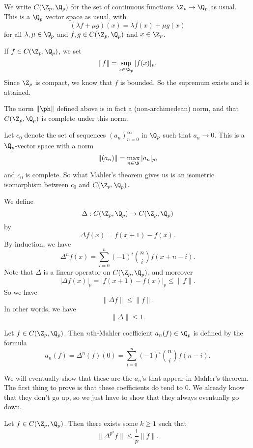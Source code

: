 \documentclass[a4paper]{article}
\begin{document}
We write $C(\Z_p, \Q_p)$ for the set of continuous functions $\Z_p \to \Q_p$ as usual. This is a $\Q_p$ vector space as usual, with
\[
  (\lambda f + \mu g)(x) = \lambda f(x) + \mu g(x)
\]
for all $\lambda, \mu \in \Q_p$ and $f, g \in C(\Z_p, \Q_p)$ and $x \in \Z_p$.

If $f \in C(\Z_p, \Q_p)$, we set
\[
  \|f\| = \sup_{x \in \Z_p} |f(x)|_p.
\]
Since $\Z_p$ is compact, we know that $f$ is bounded. So the supremum exists and is attained.

\begin{prop}
  The norm $\|\ph\|$ defined above is in fact a (non-archimedean) norm, and that $C(\Z_p, \Q_p)$ is complete under this norm.
\end{prop}

Let $c_0$ denote the set of sequences $(a_n)_{n = 0}^\infty$ in $\Q_p$ such that $a_n \to 0$. This is a $\Q_p$-vector space with a norm
\[
  \|(a_n)\| = \max_{n \in \N} |a_n|_p,
\]
and $c_0$ is complete. So what Mahler's theorem gives us is an isometric isomorphism between $c_0$ and $C(\Z_p, \Q_p)$.

We define
\[
  \Delta: C(\Z_p, \Q_p) \to C(\Z_p, \Q_p)
\]
by
\[
  \Delta f(x) = f(x + 1) - f(x).
\]
By induction, we have
\[
  \Delta^n f(x) = \sum_{i = 0}^n (-1)^i \binom{n}{i} f(x + n - i).
\]
Note that $\Delta$ is a linear operator on $C(\Z_p, \Q_p)$, and moreover
\[
  |\Delta f(x)|_p = |f(x + 1) - f(x)|_p \leq \|f\|.
\]
So we have
\[
  \|\Delta f\| \leq \|f\|.
\]
In other words, we have
\[
  \|\Delta\| \leq 1.
\]
\begin{defi}
  Let $f \in C(\Z_p, \Q_p)$. Then $n$th-Mahler coefficient $a_n(f) \in \Q_p$ is defined by the formula
  \[
    a_n(f) = \Delta^n(f)(0) = \sum_{i = 0}^n (-1)^i \binom{n}{i} f(n - i).
  \]
\end{defi}
We will eventually show that these are the $a_n$'s that appear in Mahler's theorem. The first thing to prove is that these coefficients do tend to $0$. We already know that they don't go up, so we just have to show that they always eventually go down.

\begin{lemma}
  Let $f \in C(\Z_p, \Q_p)$. Then there exists some $k\geq 1$ such that
  \[
    \|\Delta^{p^k}f\| \leq \frac{1}{p} \|f\|.
  \]
\end{lemma}
\end{document}

